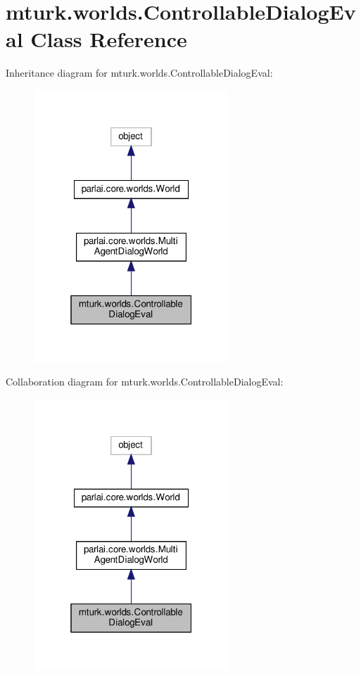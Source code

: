 \hypertarget{classmturk_1_1worlds_1_1ControllableDialogEval}{}\section{mturk.\+worlds.\+Controllable\+Dialog\+Eval Class Reference}
\label{classmturk_1_1worlds_1_1ControllableDialogEval}


Inheritance diagram for mturk.\+worlds.\+Controllable\+Dialog\+Eval\+:
\nopagebreak
\begin{figure}[H]
\begin{center}
\leavevmode
\includegraphics[width=208pt]{classmturk_1_1worlds_1_1ControllableDialogEval__inherit__graph}
\end{center}
\end{figure}


Collaboration diagram for mturk.\+worlds.\+Controllable\+Dialog\+Eval\+:
\nopagebreak
\begin{figure}[H]
\begin{center}
\leavevmode
\includegraphics[width=208pt]{classmturk_1_1worlds_1_1ControllableDialogEval__coll__graph}
\end{center}
\end{figure}
